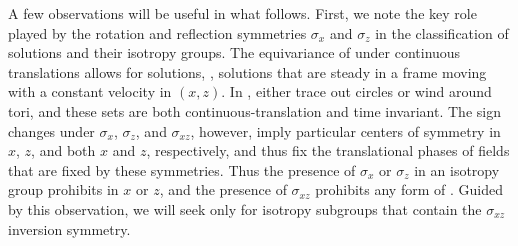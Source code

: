A few observations will be useful in what follows. First, we note the
key role played by the rotation and reflection symmetries $\sigma_x$
and $\sigma_z$  in the classification of solutions and
their isotropy groups. The equivariance of {\pCf} under
continuous translations allows for {\reqvD} solutions, \ie,
solutions that are steady in a frame moving with a constant velocity
in $(x,z)$. In {\statesp}, {\reqva} either trace out
circles or wind around tori, and these sets are both
continuous-translation and time invariant. The sign changes under
$\sigma_x$, $\sigma_{z}$, and $\sigma_{xz}$, however, imply particular
centers of symmetry in $x$, $z$, and both $x$ and $z$, respectively,
and thus fix the translational phases of fields that are fixed by these
symmetries. Thus the presence of $\sigma_x$ or $\sigma_z$ in an
isotropy group prohibits {\reqva} in $x$ or $z$, and the
presence of $\sigma_{xz}$ prohibits any form of {\reqv}. Guided
by this observation, we will seek {\eqva} only for isotropy subgroups
that contain the $\sigma_{xz}$ inversion symmetry.

